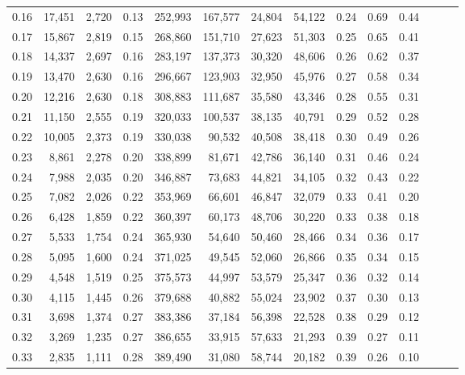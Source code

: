 \begin{tabular}{rrrrrrrrrrrrrr}
0.16 &  17,451 &  2,720 &  0.13 &  252,993 &  167,577 &  24,804 &  54,122 &  0.24 &  0.69 &      0.44 \\
0.17 &  15,867 &  2,819 &  0.15 &  268,860 &  151,710 &  27,623 &  51,303 &  0.25 &  0.65 &      0.41 \\
0.18 &  14,337 &  2,697 &  0.16 &  283,197 &  137,373 &  30,320 &  48,606 &  0.26 &  0.62 &      0.37 \\
0.19 &  13,470 &  2,630 &  0.16 &  296,667 &  123,903 &  32,950 &  45,976 &  0.27 &  0.58 &      0.34 \\
0.20 &  12,216 &  2,630 &  0.18 &  308,883 &  111,687 &  35,580 &  43,346 &  0.28 &  0.55 &      0.31 \\
0.21 &  11,150 &  2,555 &  0.19 &  320,033 &  100,537 &  38,135 &  40,791 &  0.29 &  0.52 &      0.28 \\
0.22 &  10,005 &  2,373 &  0.19 &  330,038 &   90,532 &  40,508 &  38,418 &  0.30 &  0.49 &      0.26 \\
0.23 &   8,861 &  2,278 &  0.20 &  338,899 &   81,671 &  42,786 &  36,140 &  0.31 &  0.46 &      0.24 \\
0.24 &   7,988 &  2,035 &  0.20 &  346,887 &   73,683 &  44,821 &  34,105 &  0.32 &  0.43 &      0.22 \\
0.25 &   7,082 &  2,026 &  0.22 &  353,969 &   66,601 &  46,847 &  32,079 &  0.33 &  0.41 &      0.20 \\
0.26 &   6,428 &  1,859 &  0.22 &  360,397 &   60,173 &  48,706 &  30,220 &  0.33 &  0.38 &      0.18 \\
0.27 &   5,533 &  1,754 &  0.24 &  365,930 &   54,640 &  50,460 &  28,466 &  0.34 &  0.36 &      0.17 \\
0.28 &   5,095 &  1,600 &  0.24 &  371,025 &   49,545 &  52,060 &  26,866 &  0.35 &  0.34 &      0.15 \\
0.29 &   4,548 &  1,519 &  0.25 &  375,573 &   44,997 &  53,579 &  25,347 &  0.36 &  0.32 &      0.14 \\
0.30 &   4,115 &  1,445 &  0.26 &  379,688 &   40,882 &  55,024 &  23,902 &  0.37 &  0.30 &      0.13 \\
0.31 &   3,698 &  1,374 &  0.27 &  383,386 &   37,184 &  56,398 &  22,528 &  0.38 &  0.29 &      0.12 \\
0.32 &   3,269 &  1,235 &  0.27 &  386,655 &   33,915 &  57,633 &  21,293 &  0.39 &  0.27 &      0.11 \\
0.33 &   2,835 &  1,111 &  0.28 &  389,490 &   31,080 &  58,744 &  20,182 &  0.39 &  0.26 &      0.10 \\

\end{tabular}
